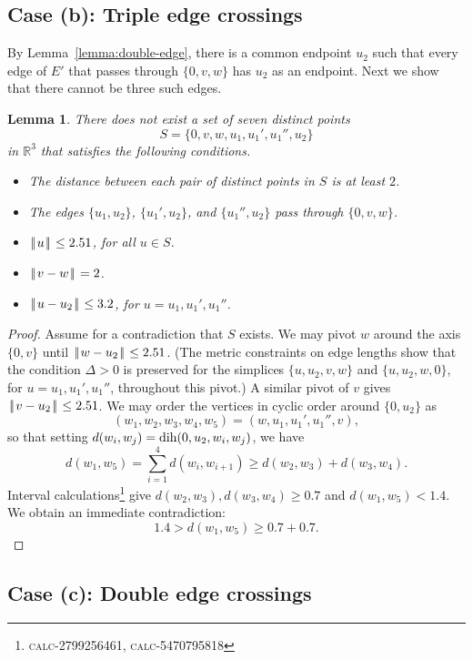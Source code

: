 \documentclass[11pt]{amsart}
\def\op#1{{\text{#1}}}
\newcommand{\ring}[1]{\mathbb{#1}}
\def\dih{\op{dih}}
\def\text{\hbox}
\def\|{{\hskip0.1em|\hskip-0.15em|\hskip0.1em}}
\def\calc#1{{\textsc{calc-#1}}}
\newtheorem{lemma}{Lemma}
\begin{document}
\subsection{Case (b): Triple edge crossings}\label{sec:13}

By Lemma~\ref{lemma:double-edge}, there is a common endpoint $u_2$ such that every edge
of $E'$ that passes through $\{0,v,w\}$ has $u_2$ as an endpoint.
Next we show that there cannot be three such edges.  


\begin{lemma}\label{lemma:three-edge}
There does not exist a set of seven distinct points
$$S=\{0,v,w,u_1,u_1',u_1'',u_2\}$$ in $\ring{R}^3$ that satisfies
the following conditions.
\begin{itemize}
\item The distance between each pair of distinct points in $S$ is at least $2$.
\item The edges $\{u_1,u_2\}$, $\{u_1',u_2\}$, and $\{u_1'',u_2\}$ pass through
$\{0,v,w\}$.
\item $\|u\|\le 2.51$, for all $u\in S$.
\item $\|v-w\|=2$.
\item $\|u-u_2\|\le 3.2$, for $u=u_1,u_1',u_1''$.
\end{itemize}
\end{lemma}

\begin{proof}
Assume for a contradiction that $S$ exists.
We may pivot $w$ around the axis $\{0,v\}$ until $\|w-u_2\|\le 2.51$.  (The metric constraints on
edge lengths show that the condition $\Delta>0$
is preserved for the simplices $\{u,u_2,v,w\}$ and $\{u,u_2,w,0\}$, for $u=u_1,u_1',u_1''$, throughout
this pivot.)  A similar
pivot of $v$ gives $\|v-u_2\|\le 2.51$.
We may order the vertices in cyclic order around $\{0,u_2\}$ as
$$(w_1,w_2,w_3,w_4,w_5)=(w,u_1,u_1',u_1'',v),$$ 
so that setting
$d(w_i,w_j) = \dih(0,u_2,w_i,w_j)$, we have
$$d(w_1,w_5)=\sum_{i=1}^4 d(w_i,w_{i+1})\ge d(w_2,w_3)+d(w_3,w_4).$$
Interval calculations\footnote{\calc{2799256461}, \calc{5470795818}} 
give $d(w_2,w_3),d(w_3,w_4)\ge 0.7$
and $d(w_1,w_5)< 1.4$. We obtain an immediate contradiction:
$$1.4 > d(w_1,w_5) \ge 0.7 + 0.7.$$
\end{proof}

\subsection{Case (c): Double edge crossings}\label{sec:12}
\end{document}
